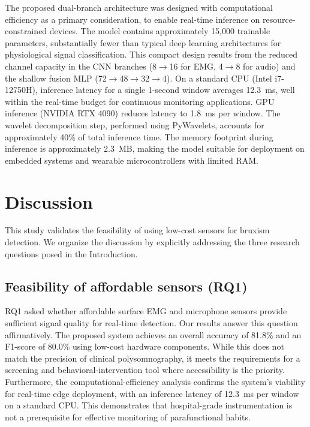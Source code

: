 \documentclass[pdflatex,sn-nature,iicol]{sn-jnl}
\begin{document}
The proposed dual-branch architecture was designed with computational efficiency as a primary consideration, to enable real-time inference on resource-constrained devices. The model contains approximately 15,000 trainable parameters, substantially fewer than typical deep learning architectures for physiological signal classification. This compact design results from the reduced channel capacity in the CNN branches (8$\rightarrow$16 for EMG, 4$\rightarrow$8 for audio) and the shallow fusion MLP (72$\rightarrow$48$\rightarrow$32$\rightarrow$4). On a standard CPU (Intel i7-12750H), inference latency for a single 1-second window averages 12.3~ms, well within the real-time budget for continuous monitoring applications. GPU inference (NVIDIA RTX 4090) reduces latency to 1.8~ms per window. The wavelet decomposition step, performed using PyWavelets, accounts for approximately 40\% of total inference time. The memory footprint during inference is approximately 2.3~MB, making the model suitable for deployment on embedded systems and wearable microcontrollers with limited RAM.


\section{Discussion}

This study validates the feasibility of using low-cost sensors for bruxism detection. We organize the discussion by explicitly addressing the three research questions posed in the Introduction.

\subsection{Feasibility of affordable sensors (RQ1)}
RQ1 asked whether affordable surface EMG and microphone sensors provide sufficient signal quality for real-time detection. Our results answer this question affirmatively. The proposed system achieves an overall accuracy of 81.8\% and an F1-score of 80.0\% using low-cost hardware components. While this does not match the precision of clinical polysomnography, it meets the requirements for a screening and behavioral-intervention tool where accessibility is the priority. Furthermore, the computational-efficiency analysis confirms the system's viability for real-time edge deployment, with an inference latency of 12.3~ms per window on a standard CPU. This demonstrates that hospital-grade instrumentation is not a prerequisite for effective monitoring of parafunctional habits.
\end{document}

